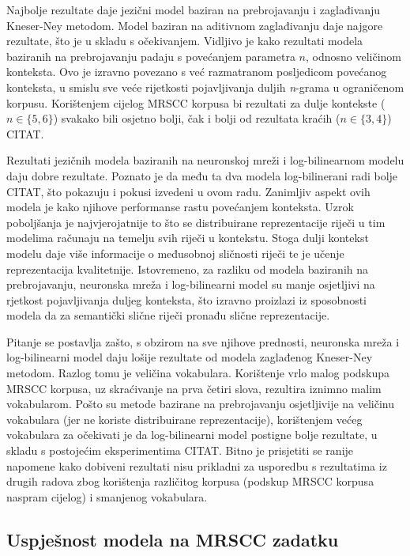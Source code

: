 \documentclass[times, utf8, diplomski, numeric]{fer}
\begin{document}
Najbolje rezultate daje jezični model baziran na prebrojavanju i zaglađivanju Kneser-Ney metodom. Model baziran na aditivnom zaglađivanju daje najgore rezultate, što je u skladu s očekivanjem. Vidljivo je kako rezultati modela baziranih na prebrojavanju padaju s povećanjem parametra $n$, odnosno veličinom konteksta. Ovo je izravno povezano s već razmatranom posljedicom povećanog konteksta, u smislu sve veće rijetkosti pojavljivanja duljih \textit{n}-grama u ograničenom korpusu. Korištenjem cijelog MRSCC korpusa bi rezultati za dulje kontekste ($n \in \{5, 6\}$) svakako bili osjetno bolji, čak i bolji od rezultata kraćih ($n \in \{3, 4\}$) CITAT.

Rezultati jezičnih modela baziranih na neuronskoj mreži i log-bilinearnom modelu daju dobre rezultate. Poznato je da među ta dva modela log-bilinerani radi bolje CITAT, što pokazuju i pokusi izvedeni u ovom radu. Zanimljiv aspekt ovih modela je kako njihove performanse rastu povećanjem konteksta. Uzrok poboljšanja je najvjerojatnije to što se distribuirane reprezentacije riječi u tim modelima računaju na temelju svih riječi u kontekstu. Stoga dulji kontekst modelu daje više informacije o međusobnoj sličnosti riječi te je učenje reprezentacija kvalitetnije. Istovremeno, za razliku od modela baziranih na prebrojavanju, neuronska mreža i log-bilinearni model su manje osjetljivi na rjetkost pojavljivanja duljeg konteksta, što izravno proizlazi iz sposobnosti modela da za semantički slične riječi pronađu slične reprezentacije.

Pitanje se postavlja zašto, s obzirom na sve njihove prednosti, neuronska mreža i log-bilinearni model daju lošije rezultate od modela zaglađenog Kneser-Ney metodom. Razlog tomu je veličina vokabulara. Korištenje vrlo malog podskupa MRSCC korpusa, uz skraćivanje na prva četiri slova, rezultira iznimno malim vokabularom. Pošto su metode bazirane na prebrojavanju osjetljivije na veličinu vokabulara (jer ne koriste distribuirane reprezentacije), korištenjem većeg vokabulara za očekivati je da log-bilinearni model postigne bolje rezultate, u skladu s postojećim eksperimentima CITAT. Bitno je prisjetiti se ranije napomene kako dobiveni rezultati nisu prikladni za usporedbu s rezultatima iz drugih radova zbog korištenja različitog korpusa (podskup MRSCC korpusa naspram cijelog) i smanjenog vokabulara.

\subsection{Uspješnost modela na MRSCC zadatku}
\end{document}
